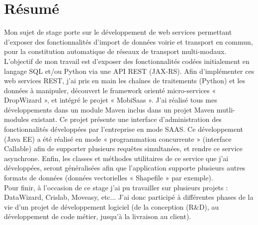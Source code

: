 \chapter*{Résumé}\label{Resume}

Mon sujet de stage porte sur le développement de web services permettant d’exposer des fonctionnalités d’import de données voirie et transport en commun, pour la constitution automatique de réseaux de transport multi-modaux. \\

L'objectif de mon travail est d'exposer des fonctionnalités codées initialement en langage SQL et/ou Python via une API REST (JAX-RS). Afin d'implémenter ces web services REST, j'ai pris en main les chaînes de traitements (Python) et les données à manipuler, découvert le framework orienté micro-services « DropWizard », et intégré le projet « MobiSaas ». J'ai réalisé tous mes développements dans un module Maven inclus dans un projet Maven mutli-modules existant. Ce projet présente une interface d'administration des fonctionnalités développées par l'entreprise en mode SAAS. Ce développement (Java EE) a été réalisé en mode « programmation concurrente » (interface Callable) afin de supporter plusieurs requêtes simultanées, et rendre ce service asynchrone. Enfin, les classes et méthodes utilitaires de ce service que j'ai développées, seront généralisées afin que l'application supporte plusieurs autres formats de données (données vectorielles « Shapefile » par exemple).\\

Pour finir, à l'occasion de ce stage j'ai pu travailler sur plusieurs projets : DataWizard, Crislab, Moveasy, etc... J'ai donc participé à différentes phases de la vie d'un projet de développement logiciel (de la conception (R\&D), au développement de code métier, jusqu'à la livraison au client).\\
